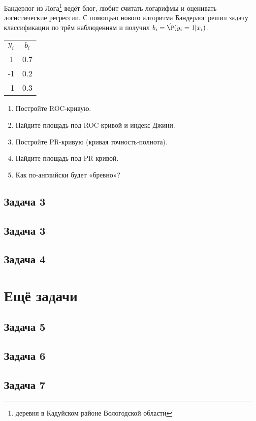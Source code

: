 \documentclass[12pt, a4paper, oneside]{article}
\begin{document}
\begin{problem}
	Бандерлог из Лога\footnote{деревня в Кадуйском районе Вологодской области} ведёт блог, любит считать логарифмы и оценивать логистические регрессии. С помощью нового алгоритма Бандерлог решил задачу классификации по трём наблюдениям и получил $b_i = \hat\P(y_i = 1|x_i)$.
	
	\begin{tabular}{cc}
		\toprule
		$y_i$ & $b_i$ \\
		\midrule
		1 & 0.7 \\
		-1 & 0.2 \\
		-1 & 0.3 \\
		\bottomrule
	\end{tabular}
	
	\begin{enumerate}
		\item Постройте ROC-кривую.
		\item Найдите площадь под ROC-кривой и индекс Джини.
		\item Постройте PR-кривую (кривая точность-полнота).
		\item Найдите площадь под PR-кривой.
		\item Как по-английски будет «бревно»?
	\end{enumerate}
	\begin{sol}
	\end{sol}
\end{problem}

\subsection*{Задача 3}

\subsection*{Задача 3}

\subsection*{Задача 4}

\section{Ещё задачи}

\subsection*{Задача 5}

\subsection*{Задача 6}
\subsection*{Задача 7}
\end{document}

